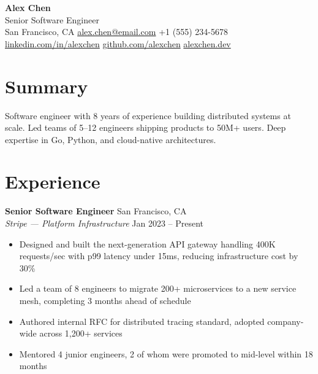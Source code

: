 \documentclass[10pt,a4paper]{article}
\newcommand{\cventry}[4]{%
    \textbf{#1} \hfill \textcolor{subtlegray}{#2}\\
    \textit{\textcolor{accent}{#3}} \hfill \textcolor{subtlegray}{#4}\\[2pt]
}
\begin{document}
\begin{center}
    {\LARGE\bfseries\textcolor{primary}{Alex Chen}}\\[4pt]
    {\large Senior Software Engineer}\\[6pt]
    \textcolor{subtlegray}{%
         San Francisco, CA \quad
         \href{mailto:alex.chen@email.com}{alex.chen@email.com} \quad
         +1 (555) 234-5678
    }\\[2pt]
    \textcolor{subtlegray}{%
         \href{https://linkedin.com/in/alexchen}{linkedin.com/in/alexchen} \quad
         \href{https://github.com/alexchen}{github.com/alexchen} \quad
         \href{https://alexchen.dev}{alexchen.dev}
    }
\end{center}

\vspace{4pt}

\section{Summary}

Software engineer with 8 years of experience building distributed systems at scale. Led teams of 5--12 engineers shipping products to 50M+ users. Deep expertise in Go, Python, and cloud-native architectures.

\section{Experience}

\cventry{Senior Software Engineer}{San Francisco, CA}{Stripe --- Platform Infrastructure}{Jan 2023 -- Present}
\begin{itemize}[leftmargin=12pt,nosep,topsep=2pt]
    \item Designed and built the next-generation API gateway handling 400K requests/sec with p99 latency under 15ms, reducing infrastructure cost by 30\%
    \item Led a team of 8 engineers to migrate 200+ microservices to a new service mesh, completing 3 months ahead of schedule
    \item Authored internal RFC for distributed tracing standard, adopted company-wide across 1,200+ services
    \item Mentored 4 junior engineers, 2 of whom were promoted to mid-level within 18 months
\end{itemize}
\end{document}
